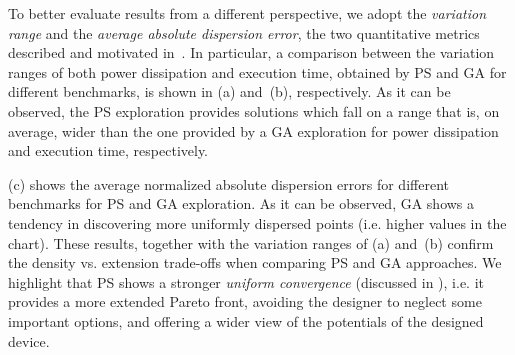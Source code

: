 To better evaluate results from a different perspective, we
adopt the \emph{variation range} and the \emph{average absolute
dispersion error}, the two quantitative metrics described and motivated
in~. In particular, a comparison between the variation
ranges of both power dissipation and execution time, obtained by PS
and GA for different benchmarks, is shown in (a) and~(b), respectively.  As it can be observed, the PS exploration provides
solutions which fall on a range that is, on average, wider than the
one provided by a GA exploration for power dissipation and execution
time, respectively.

\begin{figure}
  \begin{center}
  \end{center}
\end{figure}

(c) shows the average normalized absolute dispersion
errors for different benchmarks for PS and GA exploration.  As it can
be observed, GA shows a tendency in discovering more uniformly
dispersed points (i.e. higher values in the chart). These results,
together with the variation ranges of (a) and~(b)
confirm the density vs. extension trade-offs when comparing PS and
GA approaches. We highlight that PS shows a stronger \emph{uniform convergence} (discussed in ), i.e. it provides a more extended Pareto front, avoiding the designer to neglect some important options, and offering a wider view of the potentials of the designed device.

